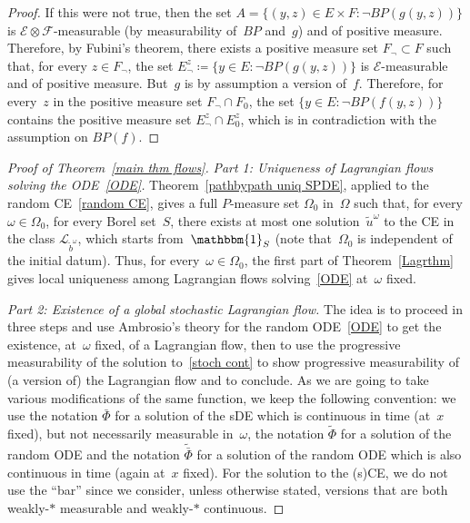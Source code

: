 \documentclass[a4paper,10pt]{article}
\newcommand\1{\mathbbm{1}}
\newcommand{\mc}{\mathcal}
\newcommand{\td}{\tilde}
\numberwithin{equation}{section}
\begin{document}
\begin{proof}
If this were not true, then the set $A=\{(y,z) \in E \times F \colon \neg BP(g(y,z))\}$ is $\mathcal{E} \otimes \mathcal{F}$-measurable (by measurability of~$BP$ and~$g$) and of positive measure. Therefore, by Fubini's theorem, there exists a positive measure set $F_{\neg} \subset F$ such that, for every $z \in F_{\neg}$, the set $E_\neg^{z} \coloneqq \{y \in E\colon \neg BP(g(y,z))\}$ is $\mathcal{E}$-measurable and of positive measure. But~$g$ is by assumption a version of~$f$. Therefore, for every~$z$ in the positive measure set $F_{\neg}\cap F_0$, the set $\{y \in E \colon\neg BP(f(y,z))\}$ contains the positive measure set $E_\neg^z\cap E_0^z$, which is in contradiction with the assumption on $BP(f)$.
\end{proof}

\begin{proof}[Proof of Theorem~\ref{main thm flows}]
\emph{Part 1: Uniqueness of Lagrangian flows solving the ODE~\eqref{ODE}.} Theorem~\ref{pathbypath uniq SPDE}, applied to the random CE~\eqref{random CE}, gives a full $P$-measure set $\Omega_0$ in~$\Omega$ such that, for every $\omega \in \Omega_0$, for every Borel set~$S$, there exists at most one solution~$\td{u}^\omega$ to the CE in the class $\mc{L}_{\td{b}^\omega}$, which starts from~$\1_S$ (note that~$\Omega_0$ is independent of the initial datum). Thus, for every~$\omega \in \Omega_0$, the first part of Theorem~\ref{Lagrthm} gives local uniqueness among Lagrangian flows solving~\eqref{ODE} at~$\omega$ fixed. 

\emph{Part 2: Existence of a global stochastic Lagrangian flow.} The idea is to proceed in three steps and use Ambrosio's theory for the random ODE~\eqref{ODE} to get the existence, at~$\omega$ fixed, of a Lagrangian flow, then to use the progressive measurability of the solution to~\eqref{stoch cont} to show progressive measurability of (a version of) the Lagrangian flow and to conclude. As we are going to take various modifications of the same function, we keep the following convention: we use the notation $\bar{\Phi}$ for a solution of the sDE which is continuous in time (at~$x$ fixed), but not necessarily measurable in~$\omega$, the notation $\td{\Phi}$ for a solution of the random ODE and the notation $\td{\bar{\Phi}}$ for a solution of the random ODE which is also continuous in time (again at~$x$ fixed). For the solution to the (s)CE, we do not use the ``bar'' since we consider, unless otherwise stated, versions that are both weakly-$*$ measurable and weakly-$*$ continuous.


\end{proof}
\end{document}
